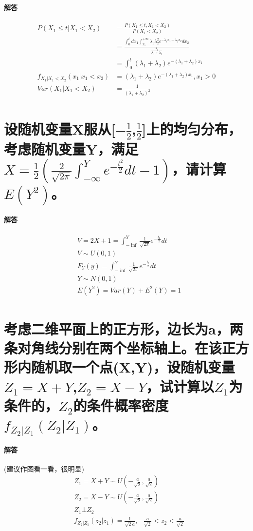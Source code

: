\documentclass[UTF8]{ctexart}
\begin{document}
\paragraph{解答}
\begin{equation*}
\begin{aligned}
P(X_1\leq t\lvert X_1<X_2)&=\frac{P(X_1\leq t,X_1<X_2)}{P(X_1<X_2)}\\
&=\frac{\int_0^tdx_1\int_{x_1}^{+\infty}\lambda_1\lambda_2^2e^{-\lambda_1x_1-\lambda_2x_2}dx_2}{\frac{\lambda_1}{\lambda_1+\lambda_2}}\\
&=\int_0^t(\lambda_1+\lambda_2)e^{-(\lambda_1+\lambda_2)x_1}\\
f_{X_1\lvert X_1<X_2}(x_1\lvert x_1<x_2)&=(\lambda_1+\lambda_2)e^{-(\lambda_1+\lambda_2)x_1},x_1>0\\
Var(X_1\lvert X_1<X_2)&=\frac{1}{(\lambda_1+\lambda_2)^2}\\
\end{aligned}
\end{equation*}
\section{设随机变量X服从[$-\frac{1}{2}$,$\frac{1}{2}$]上的均匀分布，考虑随机变量Y，满足$X=\frac{1}{2}(\frac{2}{\sqrt{2\pi}}\int_{-\infty}^Y e^{-\frac{t^2}{2}}dt-1)$，请计算$E(Y^2)$。}
\paragraph{解答}
\begin{equation*}
\begin{aligned}
&V=2X+1=\int_{-\inf}^Y\frac{1}{\sqrt{2\pi}}e^{-\frac{t_2}{2}}dt\\
&V\sim U(0,1)\\
&F_Y(y)=\int_{-\inf}^Y\frac{1}{\sqrt{2\pi}}e^{-\frac{t_2}{2}}dt\\
&Y\sim N(0,1)\\
&E(Y^2)=Var(Y)+E^2(Y)=1\\
\end{aligned}
\end{equation*}
\section{考虑二维平面上的正方形，边长为a，两条对角线分别在两个坐标轴上。在该正方形内随机取一个点(X,Y)，设随机变量$Z_1=X+Y$,$Z_2=X-Y$，试计算以$Z_1$为条件的，$Z_2$的条件概率密度$f_{Z_2\lvert Z_1}(Z_2\lvert Z_1)$。}
\paragraph{解答}
(建议作图看一看，很明显)\\
\begin{equation*}
\begin{aligned}
&Z_1=X+Y\sim U(-\frac{a}{\sqrt{2}},\frac{a}{\sqrt{2}})\\
&Z_2=X-Y\sim U(-\frac{a}{\sqrt{2}},\frac{a}{\sqrt{2}})\\
&Z_1\bot Z_2\\
&f_{Z_2\lvert Z_1}(z_2\lvert z_1)=\frac{1}{\sqrt{2}a},-\frac{a}{\sqrt{2}}<z_2<\frac{a}{\sqrt{2}}\\
\end{aligned}
\end{equation*}
\end{document}
